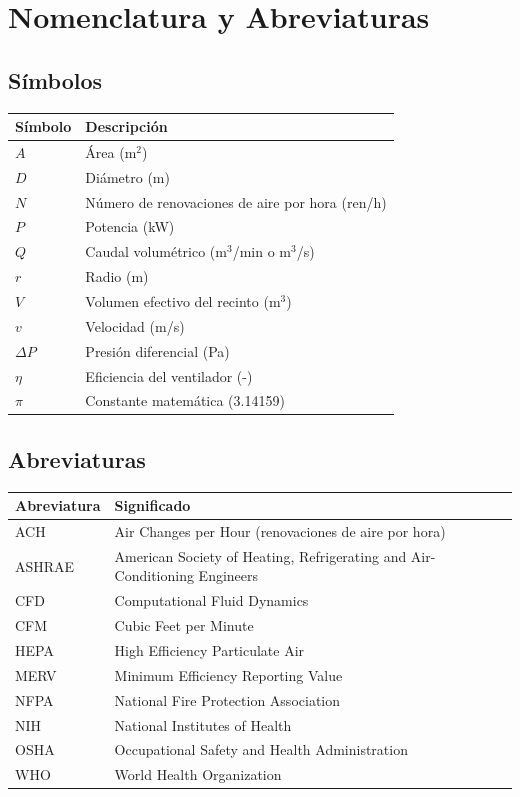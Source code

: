 \section*{Nomenclatura y Abreviaturas}

\subsection*{Símbolos}
\begin{tabularx}{\textwidth}{@{}lX@{}}
	\toprule
	\textbf{Símbolo} & \textbf{Descripción} \\
	\midrule
	$A$ & Área (m$^2$) \\
	$D$ & Diámetro (m) \\
	$N$ & Número de renovaciones de aire por hora (ren/h) \\
	$P$ & Potencia (kW) \\
	$Q$ & Caudal volumétrico (m$^3$/min o m$^3$/s) \\
	$r$ & Radio (m) \\
	$V$ & Volumen efectivo del recinto (m$^3$) \\
	$v$ & Velocidad (m/s) \\
	$\Delta P$ & Presión diferencial (Pa) \\
	$\eta$ & Eficiencia del ventilador (-) \\
	$\pi$ & Constante matemática (3.14159) \\
	\bottomrule
\end{tabularx}

\vspace{1cm}

\subsection*{Abreviaturas}
\begin{tabularx}{\textwidth}{@{}lX@{}}
	\toprule
	\textbf{Abreviatura} & \textbf{Significado} \\
	\midrule
	ACH & Air Changes per Hour (renovaciones de aire por hora) \\
	ASHRAE & American Society of Heating, Refrigerating and Air-Conditioning Engineers \\
	CFD & Computational Fluid Dynamics \\
	CFM & Cubic Feet per Minute \\
	HEPA & High Efficiency Particulate Air \\
	MERV & Minimum Efficiency Reporting Value \\
	NFPA & National Fire Protection Association \\
	NIH & National Institutes of Health \\
	OSHA & Occupational Safety and Health Administration \\
	WHO & World Health Organization \\
	\bottomrule
\end{tabularx}

\newpage
